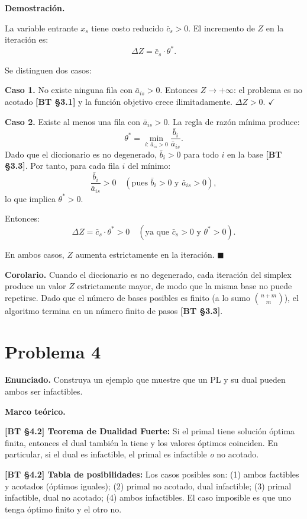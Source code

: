 \documentclass{article}
\newenvironment{marco}{\begin{mdframed}[linecolor=black!40,backgroundcolor=gray!5]\small\textbf{Marco teórico.}\par\smallskip}{\end{mdframed}\medskip}
\begin{document}
\medskip
\textbf{Demostración.}

La variable entrante $x_s$ tiene costo reducido $\bar{c}_s > 0$. El incremento de $Z$ en la iteración es:
\[
  \Delta Z = \bar{c}_s \cdot \theta^*.
\]

Se distinguen dos casos:

\textbf{Caso 1.} No existe ninguna fila con $\bar{a}_{is} > 0$. Entonces $Z \to +\infty$: el problema es no acotado \textbf{[BT §3.1]} y la función objetivo crece ilimitadamente. $\Delta Z > 0$. $\checkmark$

\textbf{Caso 2.} Existe al menos una fila con $\bar{a}_{is} > 0$. La regla de razón mínima produce:
\[
  \theta^* = \min_{i:\,\bar{a}_{is} > 0} \frac{\bar{b}_i}{\bar{a}_{is}}.
\]
Dado que el diccionario es no degenerado, $\bar{b}_i > 0$ para todo $i$ en la base \textbf{[BT §3.3]}. Por tanto, para cada fila $i$ del mínimo:
\[
  \frac{\bar{b}_i}{\bar{a}_{is}} > 0 \quad (\text{pues } \bar{b}_i > 0 \text{ y } \bar{a}_{is} > 0),
\]
lo que implica $\theta^* > 0$.

Entonces:
\[
  \Delta Z = \bar{c}_s \cdot \theta^* > 0 \quad (\text{ya que } \bar{c}_s > 0 \text{ y } \theta^* > 0).
\]

En ambos casos, $Z$ aumenta estrictamente en la iteración. $\blacksquare$

\medskip
\textbf{Corolario.} Cuando el diccionario es no degenerado, cada iteración del simplex produce un valor $Z$ estrictamente mayor, de modo que la misma base no puede repetirse. Dado que el número de bases posibles es finito (a lo sumo $\binom{n+m}{m}$), el algoritmo termina en un número finito de pasos \textbf{[BT §3.3]}.

\section*{Problema 4}

\textbf{Enunciado.} Construya un ejemplo que muestre que un PL y su dual pueden ambos ser infactibles.

\begin{marco}
\textbf{[BT §4.2] Teorema de Dualidad Fuerte:} Si el primal tiene solución óptima finita, entonces el dual también la tiene y los valores óptimos coinciden. En particular, si el dual es infactible, el primal es infactible \emph{o} no acotado.

\textbf{[BT §4.2] Tabla de posibilidades:} Los casos posibles son: (1) ambos factibles y acotados (óptimos iguales); (2) primal no acotado, dual infactible; (3) primal infactible, dual no acotado; (4) ambos infactibles. El caso imposible es que uno tenga óptimo finito y el otro no.
\end{marco}
\end{document}

